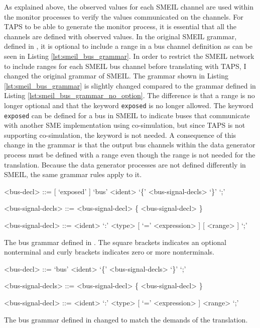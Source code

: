 As explained above, the observed values for each SMEIL channel are used within the monitor processes to verify the values communicated on the channels. For TAPS to be able to generate the monitor process, it is essential that all the channels are defined with observed values. In the original SMEIL grammar, defined in \cite{Asheim2018}, it is optional to include a range in a bus channel definition as can be seen in Listing \ref{lst:smeil_bus_grammar}.
In order to restrict the SMEIL network to include ranges for each SMEIL bus channel before translating with TAPS, I changed the original grammar of SMEIL. The grammar shown in Listing \ref{lst:smeil_bus_grammar} is slightly changed compared to the grammar defined in Listing \ref{lst:smeil_bus_grammar_no_option}. The difference is that a range is no longer optional and that the keyword \texttt{exposed} is no longer allowed. The keyword \texttt{exposed} can be defined for a bus in SMEIL to indicate buses that communicate with another SME implementation using co-simulation, but since TAPS is not supporting co-simulation, the keyword is not needed. A consequence of this change in the grammar is that the output bus channels within the data generator process must be defined with a range even though the range is not needed for the translation. Because the data generator processes are not defined differently in SMEIL, the same grammar rules apply to it.
\begin{listing}
    \begin{grammar}
    <bus-decl> ::= [ `exposed' ] `bus' <ident> `\{' <bus-signal-decls> `\}'  `;'

    <bus-signal-decls> ::= <bus-signal-decl> \{ <bus-signal-decl> \}

    <bus-signal-decl> ::= <ident> `:' <type> [ `=' <expression> ] [ <range> ] `;'
    \end{grammar}
    \caption{The bus grammar defined in \cite{Asheim2018}. The square brackets indicates an optional nonterminal and curly brackets indicates zero or more nonterminals.}
    \label{lst:smeil_bus_grammar}
\end{listing}
\begin{listing}
    \begin{grammar}
    <bus-decl> ::= `bus' <ident> `\{' <bus-signal-decls> `\}'  `;'

    <bus-signal-decls> ::= <bus-signal-decl> \{ <bus-signal-decl> \}

    <bus-signal-decl> ::= <ident> `:' <type> [ `=' <expression> ] <range> `;'
    \end{grammar}
    \caption{The bus grammar defined in \cite{Asheim2018} changed to match the demands of the translation.}
    \label{lst:smeil_bus_grammar_no_option}
\end{listing}

